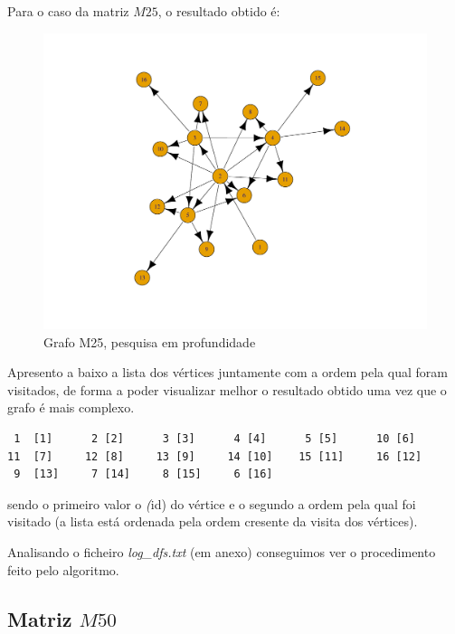 \documentclass[a4paper,12pt]{report}
\begin{document}
Para o caso da matriz $M25$, o resultado obtido é:
\begin{figure}[H]
    \centering
        \includegraphics[scale=0.22]{img/dfsM25.pdf}
    \caption{Grafo M25, pesquisa em profundidade}
    \label{fig:dfsP}
\end{figure}

Apresento a baixo a lista dos vértices juntamente com a ordem pela qual foram visitados, de forma a poder visualizar melhor o resultado obtido uma vez que o grafo é mais complexo.

\begin{lstlisting}
 1  [1]      2 [2]      3 [3]      4 [4]      5 [5]      10 [6]
11  [7]     12 [8]     13 [9]     14 [10]    15 [11]     16 [12]
 9  [13]     7 [14]     8 [15]     6 [16]
\end{lstlisting}

sendo o primeiro valor o \textit(id) do vértice e o segundo a ordem pela qual foi visitado (a lista está ordenada pela ordem cresente da visita dos vértices).

Analisando o ficheiro \textit{log\_dfs.txt} (em anexo) conseguimos ver o procedimento feito pelo algoritmo.

\subsection*{Matriz $M50$}
\end{document}
